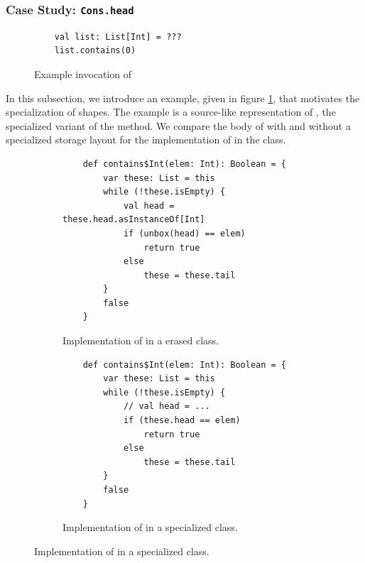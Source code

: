 \subsubsection*{Case Study: \texttt{Cons.head}}

\begin{figure}[!htb]
	\begin{verbatim}
	val list: List[Int] = ???
	list.contains(0)
	\end{verbatim}
	\caption{Example invocation of }
	\label{example:list-contains-example}
\end{figure}

In this subsection, we introduce an example, given in figure \ref{example:list-contains-example}, that motivates the specialization of shapes.
The example is a source-like representation of , the specialized variant of the  method.
We compare the body of  with and without a specialized storage layout for the implementation of  in the  class.

\begin{figure}[!htb]
	\centering
	\begin{subfigure}[b]{0.48\textwidth}
	\begin{verbatim}
	def contains$Int(elem: Int): Boolean = {
		var these: List = this
		while (!these.isEmpty) {
			val head = these.head.asInstanceOf[Int]
			if (unbox(head) == elem)
				return true
			else 
				these = these.tail
		}
		false
	}	
	\end{verbatim}
	\caption{Implementation of  in a erased  class.}
	\label{impl:cons-contains-erased}
	\end{subfigure}
	\hfill
	\begin{subfigure}[b]{0.48\textwidth}
	\begin{verbatim}
	def contains$Int(elem: Int): Boolean = {
		var these: List = this
		while (!these.isEmpty) {
			// val head = ...
			if (these.head == elem) 
				return true
			else 
				these = these.tail
		}
		false
	}	
	\end{verbatim}
	\caption{Implementation of  in a specialized  class.}
	\label{impl:cons-contains-specialized}
	\end{subfigure}
\end{figure}

